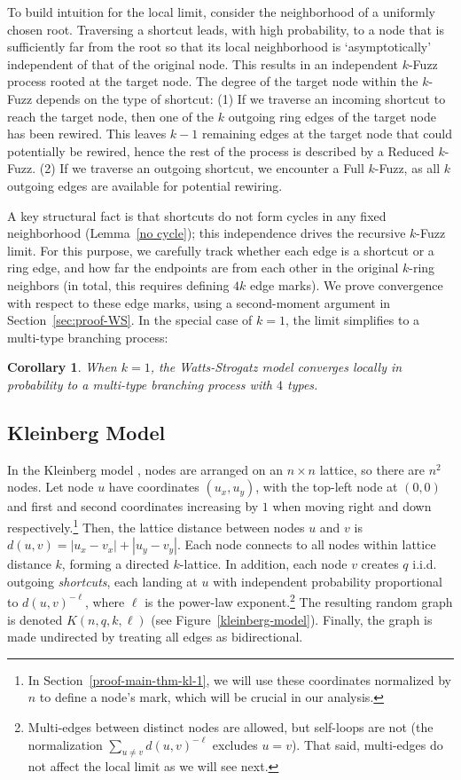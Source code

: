 \documentclass[10pt]{amsart}
\newtheorem{corollary}[theorem]{Corollary}
\begin{document}
To build intuition for the local limit, consider the neighborhood of a uniformly chosen root.   Traversing a shortcut leads, with high probability, to a node that is sufficiently far from the root so that its local neighborhood is `asymptotically' independent of that of the original node.  This results in an independent $k$-Fuzz process rooted at the target node. The degree of the target node within the $k$-Fuzz depends on the type of shortcut:
(1) If we traverse an incoming shortcut to reach the target node, then one of the  \( k \) outgoing ring edges of the target node has been rewired. This leaves \( k-1 \) remaining edges at the target node that could potentially be rewired, hence the rest of the process is described by a Reduced \( k \)-Fuzz. 
(2) If we traverse an outgoing shortcut, we encounter a Full \( k \)-Fuzz, as all \( k \) outgoing edges are available for potential rewiring.


A key structural fact is that shortcuts do not form cycles in any fixed neighborhood (Lemma~\ref{no cycle}); this independence drives the recursive $k$-Fuzz limit.  For this purpose, we carefully track whether each edge is a shortcut or a ring edge, and how far the endpoints are from each other in the original $k$-ring neighbors  (in total, this requires defining $4k$ edge marks). We prove convergence with respect to these edge marks, using a second-moment argument in Section~\ref{sec:proof-WS}. In the special case of $k=1$, the limit simplifies to a multi-type branching process:

\begin{corollary}\label{cor-ws} 
    When $k = 1$, the Watts-Strogatz model converges locally in probability to a multi-type branching process with $4$ types.
\end{corollary}

\subsection{Kleinberg Model} \label{kleinberg-process} 
In the Kleinberg model \cite{kleinberg}, nodes are arranged on an \(n \times n\) lattice, so there are $n^2$ nodes.
Let node \(u\) have coordinates \((u_x, u_y)\), with the top-left node at \((0,0)\) and first and second coordinates increasing by \(1\) when moving right and down respectively.\footnote{In Section~\ref{proof-main-thm-kl-1}, we will use these coordinates normalized by \(n\) to define a node’s mark, which will be crucial in our analysis.} Then, the lattice distance between nodes \(u\) and \(v\) is
$d(u, v) = |u_x - v_x| + |u_y - v_y|$.
 Each node connects to all nodes within lattice distance \(k\), forming a directed \(k\)-lattice.
In addition, each node $v$ creates $q$ i.i.d. outgoing \emph{shortcuts}, each landing at $u$ with independent probability proportional to $d(u,v)^{-\ell}$, where $\ell$ is the power-law exponent.\footnote{Multi-edges between distinct nodes are allowed, but self-loops are not (the normalization $\sum_{u\neq v} d(u,v)^{-\ell}$ excludes $u=v$). That said, multi-edges do not affect the local limit as we will see next.} The resulting random graph is denoted $K(n,q,k,\ell)$ (see Figure~\ref{kleinberg-model}). Finally, the graph is made undirected by treating all edges as bidirectional.
\end{document}
